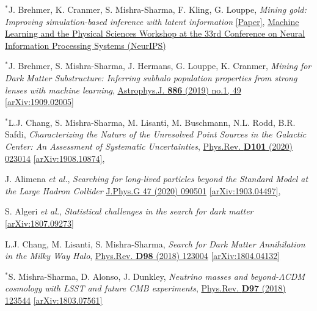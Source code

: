 \documentclass[11pt]{article}
\newenvironment{packed_enumerate}{
\begin{etaremune}
  \setlength{\itemsep}{3pt}
  \setlength{\parskip}{0pt}
  \setlength{\parsep}{0pt}}{\end{etaremune}
}
\begin{document}
\begin{packed_enumerate}
\item $^*$J. Brehmer, K. Cranmer, S. Mishra-Sharma, F. Kling, G. Louppe,  \emph{Mining gold: Improving simulation-based inference with latent information} \href{https://ml4physicalsciences.github.io/files/NeurIPS_ML4PS_2019_16.pdf}{[Paper]}, \href{https://ml4physicalsciences.github.io/}{Machine Learning and the Physical Sciences Workshop at the 33rd Conference on Neural Information Processing Systems (NeurIPS)}

\item $^*$J. Brehmer, S. Mishra-Sharma, J. Hermans, G. Louppe, K. Cranmer, \emph{Mining for Dark Matter Substructure: Inferring subhalo population properties from strong lenses with machine learning}, \href{https://iopscience.iop.org/article/10.3847/1538-4357/ab4c41}{Astrophys.J. \textbf{886} (2019) no.1, 49} \href{https://arxiv.org/abs/1909.02005}{[arXiv:1909.02005]}

\item $^*$L.J. Chang, S. Mishra-Sharma, M. Lisanti, M. Buschmann, N.L. Rodd, B.R. Safdi, \emph{Characterizing the Nature of the Unresolved Point Sources in the Galactic Center: An Assessment of Systematic Uncertainties},  \href{https://journals.aps.org/prd/abstract/10.1103/PhysRevD.101.023014}{Phys.Rev. \textbf{D101} (2020) 023014} \href{https://arxiv.org/abs/1908.10874}{[arXiv:1908.10874]}, 

\item J. Alimena \emph{et al.}, \emph{Searching for long-lived particles beyond the Standard Model at the Large Hadron Collider}  \href{https://iopscience.iop.org/article/10.1088/1361-6471/ab4574}{J.Phys.G 47 (2020) 090501} \href{https://arxiv.org/abs/1903.04497}{[arXiv:1903.04497]}, 

\item S. Algeri \emph{et al.}, \emph{Statistical challenges in the search for dark matter} \href{https://arxiv.org/abs/1807.09273}{[arXiv:1807.09273]}

\item L.J. Chang, M. Lisanti, S. Mishra-Sharma, \emph{Search for Dark Matter Annihilation in the Milky Way Halo}, \href{https://journals.aps.org/prd/abstract/10.1103/PhysRevD.98.123004}{Phys.Rev. \textbf{D98} (2018) 123004} \href{https://arxiv.org/abs/1804.04132}{[arXiv:1804.04132]}

\item $^*$S. Mishra-Sharma, D. Alonso, J. Dunkley, \emph{Neutrino masses and beyond-$\Lambda$CDM cosmology with LSST and future CMB experiments}, \href{https://journals.aps.org/prd/abstract/10.1103/PhysRevD.97.123544}{Phys.Rev. \textbf{D97} (2018) 123544}  \href{https://arxiv.org/abs/1803.07561}{[arXiv:1803.07561]}


\end{packed_enumerate}
\end{document}
